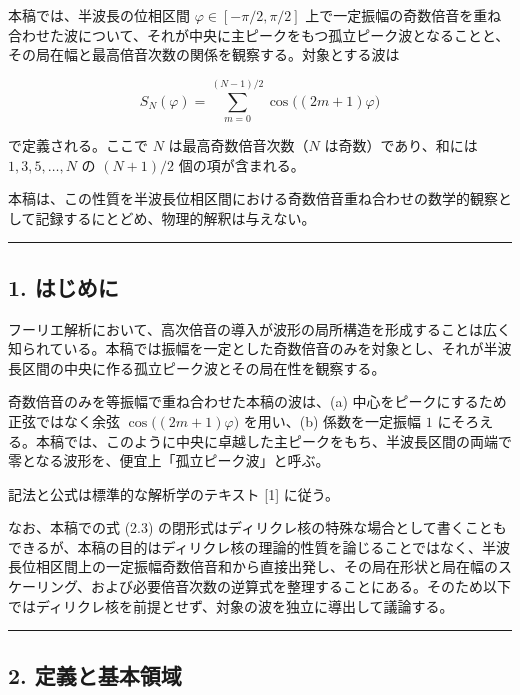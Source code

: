 \documentclass[
]{ltjsarticle}
\begin{document}
本稿では、半波長の位相区間 \(\varphi\in[-\pi/2,\pi/2]\)
上で一定振幅の奇数倍音を重ね合わせた波について、それが中央に主ピークをもつ孤立ピーク波となることと、その局在幅と最高倍音次数の関係を観察する。対象とする波は

\[
S_N(\varphi)=\sum_{m=0}^{(N-1)/2}\cos\!\big((2m+1)\varphi\big)
\]

で定義される。ここで \(N\) は最高奇数倍音次数（\(N\)
は奇数）であり、和には \(1,3,5,\dots,N\) の \((N+1)/2\)
個の項が含まれる。

本稿は、この性質を半波長位相区間における奇数倍音重ね合わせの数学的観察として記録するにとどめ、物理的解釈は与えない。

\begin{center}\rule{0.5\linewidth}{0.5pt}\end{center}

\subsection{1. はじめに}\label{ux306fux3058ux3081ux306b}

フーリエ解析において、高次倍音の導入が波形の局所構造を形成することは広く知られている。本稿では振幅を一定とした奇数倍音のみを対象とし、それが半波長区間の中央に作る孤立ピーク波とその局在性を観察する。

奇数倍音のみを等振幅で重ね合わせた本稿の波は、(a)
中心をピークにするため正弦ではなく余弦 \(\cos\!\big((2m+1)\varphi\big)\)
を用い、(b) 係数を一定振幅 \(1\)
にそろえる。本稿では、このように中央に卓越した主ピークをもち、半波長区間の両端で零となる波形を、便宜上「孤立ピーク波」と呼ぶ。

記法と公式は標準的な解析学のテキスト {[}1{]} に従う。

なお、本稿での式 (2.3)
の閉形式はディリクレ核の特殊な場合として書くこともできるが、本稿の目的はディリクレ核の理論的性質を論じることではなく、半波長位相区間上の一定振幅奇数倍音和から直接出発し、その局在形状と局在幅のスケーリング、および必要倍音次数の逆算式を整理することにある。そのため以下ではディリクレ核を前提とせず、対象の波を独立に導出して議論する。

\begin{center}\rule{0.5\linewidth}{0.5pt}\end{center}

\subsection{2.
定義と基本領域}\label{ux5b9aux7fa9ux3068ux57faux672cux9818ux57df}
\end{document}
